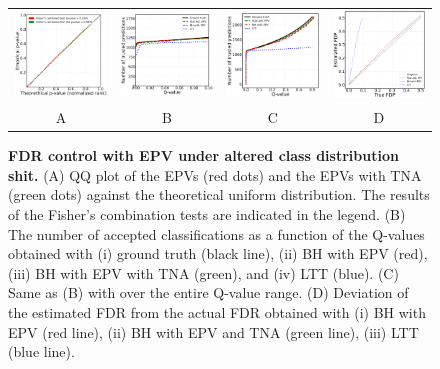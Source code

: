\documentclass{article}
\begin{document}
\begin{figure}[h!]
	\centering
	\begin{tabular}{cccc}
		\includegraphics[width=1.7in]{img/cnn_QQ_balanced.png}&
		\includegraphics[width=1.7in]{img/cnn_balanced_fdr_control_loc.png} &
		\includegraphics[width=1.7in]{img/cnn_balanced_fdr_control.png} & 
		\includegraphics[width=1.7in]{img/cnn_FDPscat_balanced.png} \\		
		A & B & C & D \\
	\end{tabular}
	\caption{{\bf  FDR control with EPV under altered class distribution shit.}
		(A) QQ plot of the EPVs (red dots) and the EPVs with TNA (green dots) against the theoretical uniform distribution. The results of the Fisher's combination tests are indicated in the legend. (B) The number of accepted classifications as a function of the Q-values obtained with (i) ground truth (black line), (ii) BH with EPV (red), (iii) BH with EPV with TNA (green), and (iv) LTT (blue). (C) Same as (B) with over the entire Q-value range. (D) Deviation of the estimated FDR from the actual FDR obtained with (i) BH with EPV (red line), (ii) BH with EPV and TNA (green line), (iii) LTT (blue line).}
	\label{fig:mnist_rebalance}
\end{figure}
\end{document}
